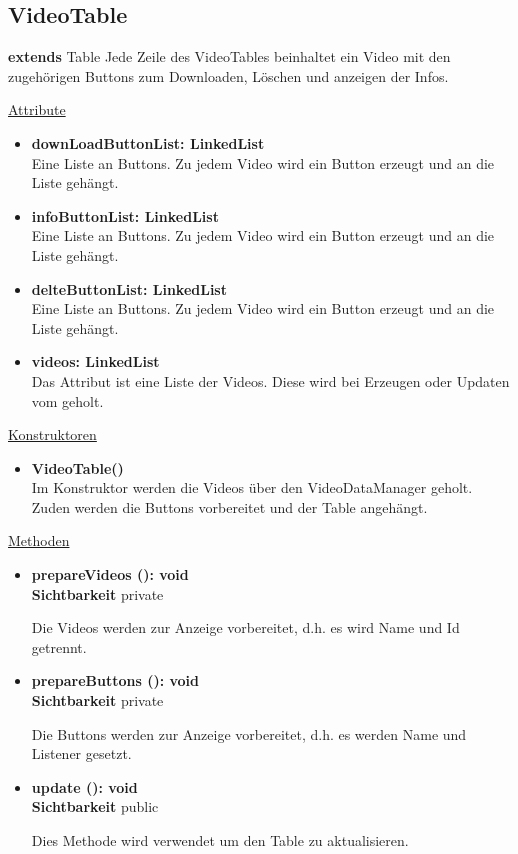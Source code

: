 \newpage
\subsection{VideoTable}\label{VideoTable}
\textbf{extends}  Table \newline
Jede Zeile des VideoTables beinhaltet ein Video mit den zugehörigen Buttons zum Downloaden, Löschen und anzeigen der Infos.

\underline{Attribute}
\begin{itemize}
\itemsep0pt

\item \textbf{downLoadButtonList: LinkedList} \hfill\\ 
Eine Liste an Buttons. Zu jedem Video wird ein Button erzeugt und an die Liste gehängt.

\item \textbf{infoButtonList: LinkedList} \hfill\\ 
Eine Liste an Buttons. Zu jedem Video wird ein Button erzeugt und an die Liste gehängt.

\item \textbf{delteButtonList: LinkedList} \hfill\\ 
Eine Liste an Buttons. Zu jedem Video wird ein Button erzeugt und an die Liste gehängt.

\item \textbf{videos: LinkedList} \hfill\\ 
Das Attribut ist eine Liste der Videos. Diese wird bei Erzeugen oder Updaten vom  geholt.
\end{itemize}

\underline{Konstruktoren}
\begin{itemize}
\itemsep0pt

\item \textbf{VideoTable()} \hfill\\ 
Im Konstruktor werden die Videos über den VideoDataManager geholt. Zuden werden die Buttons vorbereitet und der Table angehängt.

\end{itemize}


\underline{Methoden}
\begin{itemize}
\itemsep0pt

\item \textbf{prepareVideos (): void}\hfill\\
\textbf{Sichtbarkeit} private

Die Videos werden zur Anzeige vorbereitet, d.h. es wird Name und Id getrennt.

\item \textbf{prepareButtons (): void}\hfill\\
\textbf{Sichtbarkeit} private

Die Buttons werden zur Anzeige vorbereitet, d.h. es werden Name und Listener gesetzt.

\item \textbf{update (): void}\hfill\\
\textbf{Sichtbarkeit} public

Dies Methode wird verwendet um den Table zu aktualisieren.

\end{itemize}
